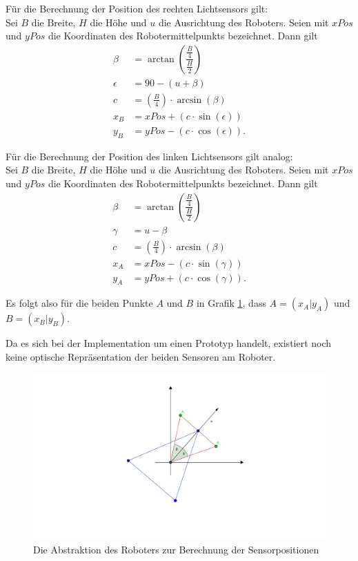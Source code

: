 \documentclass[paper=a4, DIV=calc, BCOR=15mm, twoside=on, onecolumn=on, open = right, titlepage =on, parskip =half, headsepline = on, footsepline = on, chapterprefix = off, appendixprefix = off, fontsize = 12pt, numbers = noenddot, abstract = on]{scrbook}
\begin{document}
Für die Berechnung der Position des rechten Lichtsensors gilt:\\
Sei $B$ die Breite, $H$ die Höhe und $u$ die Ausrichtung des Roboters. Seien mit $xPos$ und $yPos$ die Koordinaten des Robotermittelpunkts bezeichnet. Dann gilt
\renewcommand\arraystretch{3}
\begin{align*}
\beta & = \arctan \left( \dfrac{\frac{B}{4}}{\frac{H}{2}} \right)\\
\epsilon & = 90 - (u + \beta)\\
c & = \left( \frac{B}{4} \right) \cdot \arcsin (\beta)\\
x_B & = xPos + \left( c \cdot \sin(\epsilon) \right)\\
y_B & = yPos - \left( c \cdot \cos(\epsilon) \right).
\end{align*}

Für die Berechnung der Position des linken Lichtsensors gilt analog:\\
Sei $B$ die Breite, $H$ die Höhe und $u$ die Ausrichtung des Roboters. Seien mit $xPos$ und $yPos$ die Koordinaten des Robotermittelpunkts bezeichnet. Dann gilt
\renewcommand\arraystretch{3}
\begin{align*}
\beta & = \arctan \left( \dfrac{\frac{B}{4}}{\frac{H}{2}} \right)\\
\gamma & = u - \beta\\
c & = \left( \frac{B}{4} \right) \cdot \arcsin (\beta)\\
x_A & = xPos - \left( c \cdot \sin(\gamma) \right)\\
y_A & = yPos + \left( c \cdot \cos(\gamma) \right).
\end{align*}

Es folgt also für die beiden Punkte $A$ und $B$ in Grafik \ref{fig:roboter_abstrakt}, dass $A = \left( x_A \vert y_A \right)$ und $B = \left( x_B \vert y_B \right)$.

\vspace*{2ex}
Da es sich bei der Implementation um einen Prototyp handelt, existiert noch keine optische Repräsentation der beiden Sensoren am Roboter. 

\begin{figure}[htbp]
\centering
\includegraphics[width=\textwidth]{images/lichtsensorgrafik.png} 
\caption{Die Abstraktion des Roboters zur Berechnung der Sensorpositionen}
\label{fig:roboter_abstrakt}
\end{figure}
\end{document}
